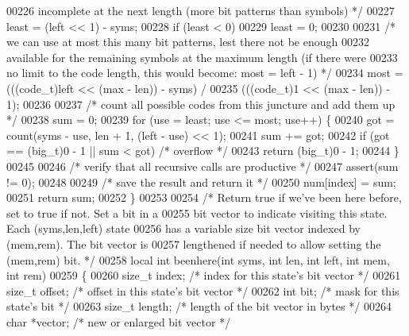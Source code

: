 \begin{DoxyCode}
00226 \textcolor{comment}{       incomplete at the next length (more bit patterns than symbols) */}
00227     least = (left << 1) - syms;
00228     \textcolor{keywordflow}{if} (least < 0)
00229         least = 0;
00230 
00231     \textcolor{comment}{/* we can use at most this many bit patterns, lest there not be enough}
00232 \textcolor{comment}{       available for the remaining symbols at the maximum length (if there were}
00233 \textcolor{comment}{       no limit to the code length, this would become: most = left - 1) */}
00234     most = (((code\_t)left << (max - len)) - syms) /
00235             (((code\_t)1 << (max - len)) - 1);
00236 
00237     \textcolor{comment}{/* count all possible codes from this juncture and add them up */}
00238     sum = 0;
00239     \textcolor{keywordflow}{for} (use = least; use <= most; use++) \{
00240         got = count(syms - use, len + 1, (left - use) << 1);
00241         sum += got;
00242         \textcolor{keywordflow}{if} (got == (big\_t)0 - 1 || sum < got)   \textcolor{comment}{/* overflow */}
00243             \textcolor{keywordflow}{return} (big\_t)0 - 1;
00244     \}
00245 
00246     \textcolor{comment}{/* verify that all recursive calls are productive */}
00247     assert(sum != 0);
00248 
00249     \textcolor{comment}{/* save the result and return it */}
00250     num[index] = sum;
00251     \textcolor{keywordflow}{return} sum;
00252 \}
00253 
00254 \textcolor{comment}{/* Return true if we've been here before, set to true if not.  Set a bit in a}
00255 \textcolor{comment}{   bit vector to indicate visiting this state.  Each (syms,len,left) state}
00256 \textcolor{comment}{   has a variable size bit vector indexed by (mem,rem).  The bit vector is}
00257 \textcolor{comment}{   lengthened if needed to allow setting the (mem,rem) bit. */}
00258 local \textcolor{keywordtype}{int} beenhere(\textcolor{keywordtype}{int} syms, \textcolor{keywordtype}{int} len, \textcolor{keywordtype}{int} left, \textcolor{keywordtype}{int} mem, \textcolor{keywordtype}{int} rem)
00259 \{
00260     \textcolor{keywordtype}{size\_t} index;       \textcolor{comment}{/* index for this state's bit vector */}
00261     \textcolor{keywordtype}{size\_t} offset;      \textcolor{comment}{/* offset in this state's bit vector */}
00262     \textcolor{keywordtype}{int} bit;            \textcolor{comment}{/* mask for this state's bit */}
00263     \textcolor{keywordtype}{size\_t} length;      \textcolor{comment}{/* length of the bit vector in bytes */}
00264     \textcolor{keywordtype}{char} *vector;       \textcolor{comment}{/* new or enlarged bit vector */}

\end{DoxyCode}
